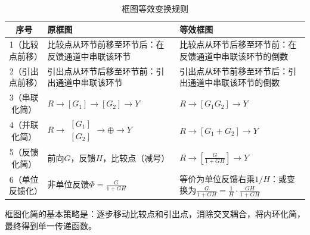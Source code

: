 \begin{table}[H]
\centering
\caption{框图等效变换规则}
\label{tab:block-rules}
\renewcommand{\arraystretch}{1.6}
\begin{tabular}{|c|p{4.5cm}|p{4.5cm}|}
\hline
\textbf{序号} & \textbf{原框图} & \textbf{等效框图} \\
\hline
1（比较点前移） &
比较点从环节前移至环节后：在反馈通道中串联该环节 &
比较点从环节后移至环节前：在反馈通道中串联该环节的倒数 \\
\hline
2（引出点前移） &
引出点从环节后移至环节前：引出通道中串联该环节 &
引出点从环节前移至环节后：引出通道中串联该环节的倒数 \\
\hline
3（串联化简） &
$R \rightarrow [G_1] \rightarrow [G_2] \rightarrow Y$ &
$R \rightarrow [G_1G_2] \rightarrow Y$ \\
\hline
4（并联化简） &
$R \rightarrow \begin{matrix} [G_1] \\ [G_2] \end{matrix} \rightarrow \oplus \rightarrow Y$ &
$R \rightarrow [G_1+G_2] \rightarrow Y$ \\
\hline
5（反馈化简） &
前向$G$，反馈$H$，比较点（减号） &
$R \rightarrow [\frac{G}{1+GH}] \rightarrow Y$ \\
\hline
6（单位反馈化） &
非单位反馈$\Phi = \frac{G}{1+GH}$ &
等价为单位反馈右乘$1/H$：或变换为$\frac{G}{1+GH} = \frac{1}{H}\cdot\frac{GH}{1+GH}$ \\
\hline
\end{tabular}
\end{table}

框图化简的基本策略是：逐步移动比较点和引出点，消除交叉耦合，将内环化简，最终得到单一传递函数。

